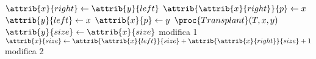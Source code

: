 \begin{codebox}
\li $\attrib{x}{right} \gets \attrib{y}{left}$
\li $\attrib{\attrib{x}{right}}{p} \gets x$
\li $\attrib{y}{left} \gets x$
\li $\attrib{x}{p} \gets y$
\li $\proc{Transplant}(T,x,y)$
\li $\attrib{y}{size} \gets \attrib{x}{size}$
		\Comment modifica 1
\li $\attrib{x}{size} \gets \attrib{\attrib{x}{left}}{size} + \attrib{\attrib{x}{right}}{size} + 1$
		\Comment modifica 2
\end{codebox}